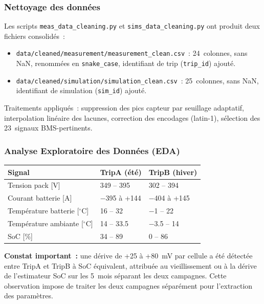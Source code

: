 \documentclass[a4paper,11pt]{article}
\begin{document}
\subsubsection{Nettoyage des données}

Les scripts \texttt{meas\_data\_cleaning.py} et \texttt{sims\_data\_cleaning.py}
ont produit deux fichiers consolidés~:

\begin{itemize}[nosep]
  \item \texttt{data/cleaned/measurement/measurement\_clean.csv}~:
    24~colonnes, sans NaN, renommées en \texttt{snake\_case}, identifiant de trip
    (\texttt{trip\_id}) ajouté.
  \item \texttt{data/cleaned/simulation/simulation\_clean.csv}~:
    25~colonnes, sans NaN, identifiant de simulation (\texttt{sim\_id}) ajouté.
\end{itemize}

Traitements appliqués~: suppression des pics capteur par seuillage adaptatif,
interpolation linéaire des lacunes, correction des encodages (latin-1),
sélection des 23~signaux BMS-pertinents.

\subsubsection{Analyse Exploratoire des Données (EDA)}

\begin{center}
\small\renewcommand{\arraystretch}{1.3}
\begin{tabular}{lll}
\toprule
\textbf{Signal} & \textbf{TripA (été)} & \textbf{TripB (hiver)} \\
\midrule
Tension pack [V] & 349 -- 395 & 302 -- 394 \\
Courant batterie [A] & $-$395 à +144 & $-$404 à +145 \\
Température batterie [$^\circ$C] & 16 -- 32 & $-$1 -- 22 \\
Température ambiante [$^\circ$C] & 14 -- 33.5 & $-$3.5 -- 14 \\
SoC [\%] & 34 -- 89 & 0 -- 86 \\
\bottomrule
\end{tabular}
\end{center}

\textbf{Constat important~:} une dérive de +25 à +80~mV par cellule a été
détectée entre TripA et TripB à SoC équivalent, attribuée au vieillissement
ou à la dérive de l'estimateur SoC sur les 5~mois séparant les deux campagnes.
Cette observation impose de traiter les deux campagnes séparément pour
l'extraction des paramètres.
\end{document}

